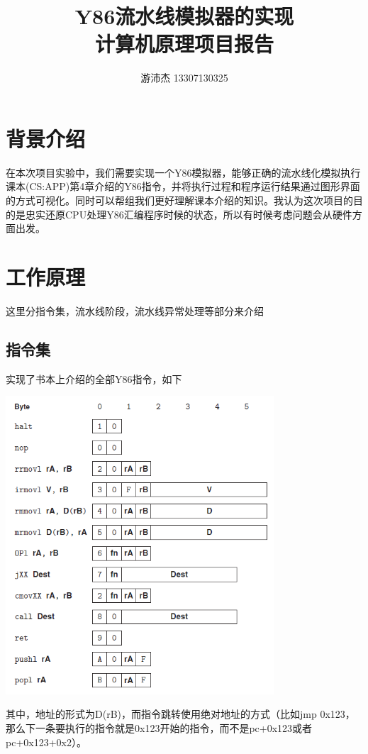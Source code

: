 \documentclass{article}
\title{Y86流水线模拟器的实现\\计算机原理项目报告}
\author{游沛杰 13307130325}
\begin{document}
\maketitle
\tableofcontents
\newpage

\section{背景介绍}
\indent\indent
在本次项目实验中，我们需要实现一个Y86模拟器，能够正确的流水线化模拟执行课本(CS:APP\cite{1})第4章介绍的Y86指令，并将执行过程和程序运行结果通过图形界面的方式可视化。同时可以帮组我们更好理解课本介绍的知识。我认为这次项目的目的是忠实还原CPU处理Y86汇编程序时候的状态，所以有时候考虑问题会从硬件方面出发。

\section{工作原理}
这里分指令集，流水线阶段，流水线异常处理等部分来介绍
\subsection{指令集}
实现了书本上介绍的全部Y86指令，如下

\begin{center}
\includegraphics[width = 10cm]{1.png}
\end{center}

其中，地址的形式为D(rB)，而指令跳转使用绝对地址的方式（比如jmp 0x123，那么下一条要执行的指令就是0x123开始的指令，而不是pc+0x123或者pc+0x123+0x2）。
\end{document}
